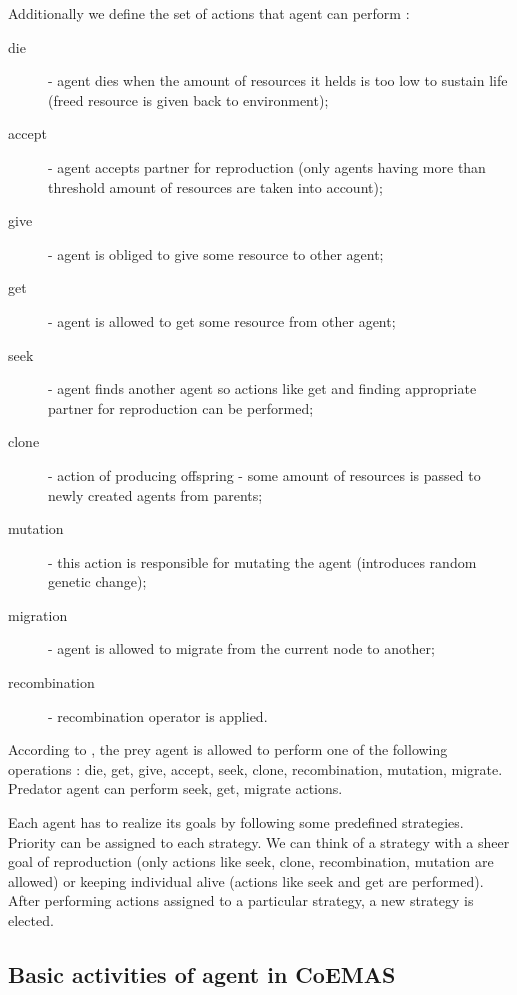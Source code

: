 Additionally we define the set of actions that agent can perform :

\begin{description}
  \item [die]
      - agent dies when the amount of resources it helds is too low to sustain life (freed resource is given back to environment);
  \item [accept]
      - agent accepts partner for reproduction (only agents having more than threshold amount of resources are taken into account);
  \item [give]
      - agent is obliged to give some resource to other agent;
  \item [get]
      - agent is allowed to get some resource from other agent;
  \item [seek]
      - agent finds another agent so actions like get and finding appropriate partner for reproduction can be performed;
  \item [clone]
      - action of producing offspring - some amount of resources is passed to newly created agents from parents;
  \item [mutation]
      - this action is responsible for mutating the agent (introduces random genetic change);
  \item [migration]
      - agent is allowed to migrate from the current node to another;
  \item [recombination]
      - recombination operator is applied.

\end{description}


According to \cite{Dre}, the prey agent is allowed to perform one of the following operations : die, get, give, accept, seek, clone, recombination, mutation,
 migrate. Predator agent can perform seek, get, migrate actions.

Each agent has to realize its goals by following some predefined strategies.
Priority can be assigned to each strategy.
We can think of a strategy with a sheer goal of reproduction (only actions like seek, clone, recombination, mutation are allowed) or keeping individual alive
(actions like seek and get are performed).
After performing actions assigned to a particular strategy, a new strategy is elected. 

\subsection{Basic activities of agent in CoEMAS}


